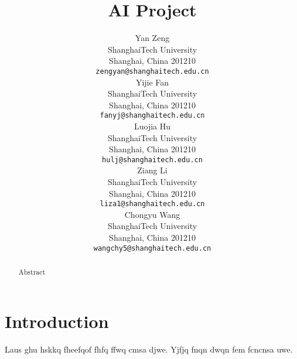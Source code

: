 \documentclass{article}
\title{AI Project}
\author{
    Yan Zeng\\
    ShanghaiTech University\\
    Shanghai, China 201210\\
    \texttt{zengyan@shanghaitech.edu.cn}\\
    \AND
    Yijie Fan\\
    ShanghaiTech University\\
    Shanghai, China 201210\\
    \texttt{fanyj@shanghaitech.edu.cn}\\
    \AND
    Luojia Hu\\
    ShanghaiTech University\\
    Shanghai, China 201210\\
    \texttt{hulj@shanghaitech.edu.cn}\\
    \AND
    Ziang Li\\
    ShanghaiTech University\\
    Shanghai, China 201210\\
    \texttt{liza1@shanghaitech.edu.cn}\\
    \AND
    Chongyu Wang\\
    ShanghaiTech University\\
    Shanghai, China 201210\\
    \texttt{wangchy5@shanghaitech.edu.cn}\\    
}
\begin{document}
\maketitle

\begin{abstract}
    Abstract
\end{abstract}


\section{Introduction}

Laus ghu hskkq fheefqof fhfq ffwq cmsa djwe. Yjfjq fnqn dwqn fem fcncnsa uwe.
\end{document}
